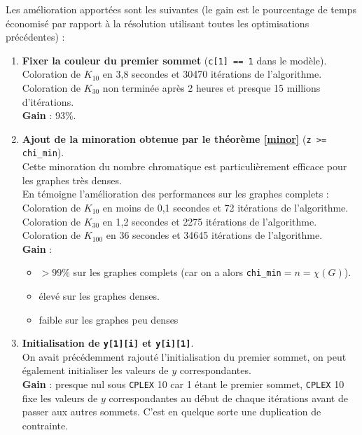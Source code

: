 Les amélioration apportées sont les suivantes (le gain est le pourcentage
de temps économisé par rapport à la résolution utilisant toutes les optimisations précédentes) :
\begin{enumerate}
 \item \label{p1}\textbf{Fixer la couleur du premier sommet} (\verb?c[1] == 1? dans le modèle).\\
    Coloration de $K_{10}$ en 3,8 secondes et 30470 itérations de l'algorithme.\\
    Coloration de $K_{30}$ non terminée après 2 heures et presque 15 millions d'itérations.\\
    \textbf{Gain} : 93\%.
 \item \label{p2}\textbf{Ajout de la minoration obtenue par le théorème \ref{minor}} (\verb?z >= chi_min?).\\
    Cette minoration du nombre chromatique est particulièrement efficace pour les graphes très denses.\\
    En témoigne l'amélioration des performances sur les graphes complets :\\
    Coloration de $K_{10}$ en moins de 0,1 secondes et 72 itérations de l'algorithme.\\
    Coloration de $K_{30}$ en 1,2 secondes et 2275 itérations de l'algorithme.\\
    Coloration de $K_{100}$ en 36 secondes et 34645 itérations de l'algorithme.\\
    \textbf{Gain} : 
    \begin{itemize}
      \item $>99\%$ sur les graphes complets (car on a alors
	\verb?chi_min?$=n=\chi(G)$).
      \item élevé sur les graphes denses.
      \item faible sur les graphes peu denses
    \end{itemize}
 \item \label{p3}\textbf{Initialisation de \verb?y[1][i]? et \verb?y[i][1]?}.\\
    On avait précédemment rajouté l'initialisation du premier sommet, on peut
    également initialiser les valeurs de $y$ correspondantes.\\
    \textbf{Gain} : presque nul sous \verb?CPLEX? 10 car 1 étant le premier sommet, \verb?CPLEX? 10 fixe
      les valeurs de $y$ correspondantes au début de chaque itérations avant de passer aux autres sommets.
      C'est en quelque sorte une duplication de contrainte.\\

\end{enumerate}
